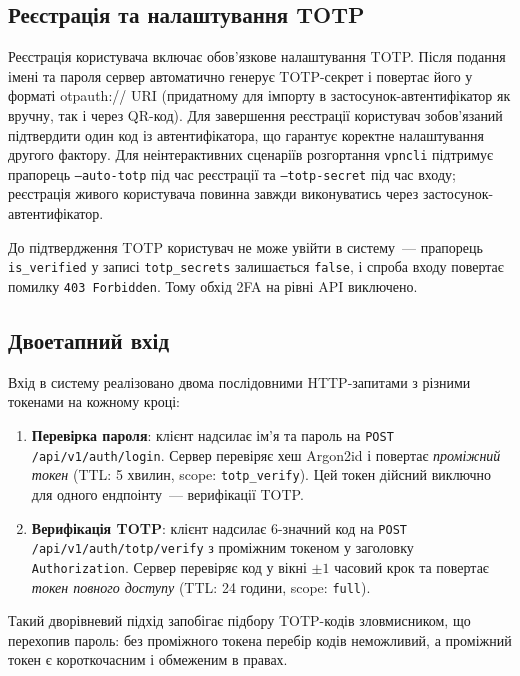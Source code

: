 \subsection{Реєстрація та налаштування TOTP}

Реєстрація користувача включає обов'язкове налаштування TOTP. Після
подання імені та пароля сервер автоматично генерує TOTP-секрет і повертає
його у форматі otpauth:// URI (придатному для імпорту в застосунок-автентифікатор
як вручну, так і через QR-код). Для завершення
реєстрації користувач зобов'язаний підтвердити один код із автентифікатора,
що гарантує коректне налаштування другого фактору.
Для неінтерактивних сценаріїв розгортання \texttt{vpncli} підтримує
прапорець \texttt{--auto-totp} під час реєстрації та \texttt{--totp-secret}
під час входу; реєстрація живого користувача повинна завжди виконуватись
через застосунок-автентифікатор.

До підтвердження TOTP користувач не може увійти в систему~--- прапорець
\texttt{is\_verified} у записі \texttt{totp\_secrets} залишається
\texttt{false}, і спроба входу повертає помилку \texttt{403 Forbidden}.
Тому обхід 2FA на рівні API виключено.

\subsection{Двоетапний вхід}

Вхід в систему реалізовано двома послідовними HTTP-запитами з різними
токенами на кожному кроці:

\begin{enumerate}
  \item \textbf{Перевірка пароля}: клієнт надсилає ім'я та пароль на
    \texttt{POST /api/v1/auth/login}. Сервер перевіряє хеш Argon2id
    і повертає \textit{проміжний токен} (TTL: 5 хвилин, scope:
    \texttt{totp\_verify}). Цей токен дійсний виключно для одного
    ендпоінту~--- верифікації TOTP.

  \item \textbf{Верифікація TOTP}: клієнт надсилає 6-значний код
    на \texttt{POST /api/v1/auth/totp/verify} з проміжним токеном
    у заголовку \texttt{Authorization}. Сервер перевіряє код у вікні
    $\pm1$ часовий крок та повертає \textit{токен повного доступу}
    (TTL: 24 години, scope: \texttt{full}).
\end{enumerate}

Такий дворівневий підхід запобігає підбору TOTP-кодів зловмисником,
що перехопив пароль: без проміжного токена перебір кодів неможливий,
а проміжний токен є короткочасним і обмеженим в правах.


